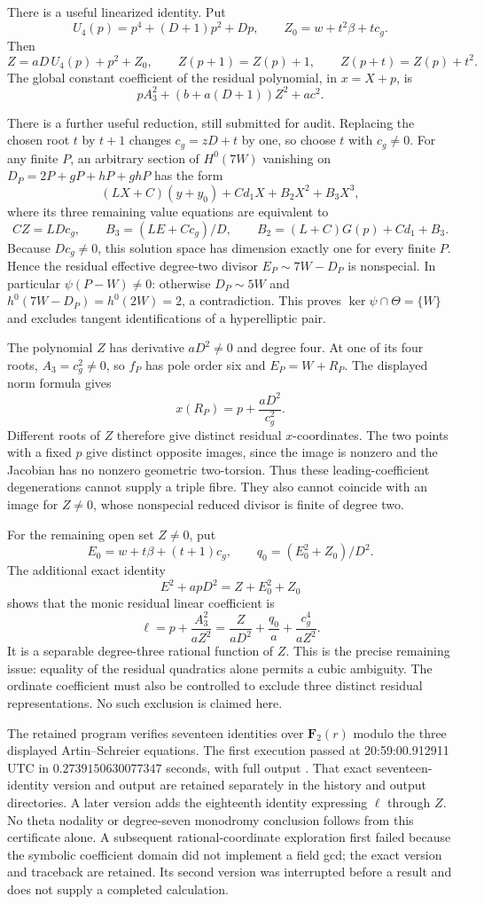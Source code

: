There is a useful linearized identity. Put
\[
 U_4(p)=p^4+(D+1)p^2+Dp,\qquad
 Z_0=w+t^2\beta+tc_g.
\]
Then
\[
 Z=aD\,U_4(p)+p^2+Z_0,\qquad
 Z(p+1)=Z(p)+1,\qquad Z(p+t)=Z(p)+t^2.
\]
The global constant coefficient of the residual polynomial, in
$x=X+p$, is
\[
 pA_3^2+(b+a(D+1))Z^2+ac^2.
\]

There is a further useful reduction, still submitted for audit.
Replacing the chosen root $t$ by $t+1$ changes $c_g=zD+t$ by one,
so choose $t$ with $c_g\ne0$. For any finite $P$, an arbitrary
section of $H^0(7W)$ vanishing on
$D_P=2P+gP+hP+ghP$ has the form
\[
 (LX+C)(y+y_0)+Cd_1X+B_2X^2+B_3X^3,
\]
where its three remaining value equations are equivalent to
\[
 CZ=LDc_g,\qquad
 B_3=(LE+Cc_g)/D,\qquad
 B_2=(L+C)G(p)+Cd_1+B_3.
\]
Because $Dc_g\ne0$, this solution space has dimension exactly
one for every finite $P$. Hence the residual effective degree-two
divisor $E_P\sim7W-D_P$ is nonspecial. In particular
$\psi(P-W)\ne0$: otherwise $D_P\sim5W$ and
$h^0(7W-D_P)=h^0(2W)=2$, a contradiction.
This proves $\ker\psi\cap\Theta=\{W\}$ and excludes tangent
identifications of a hyperelliptic pair.

The polynomial $Z$ has derivative $aD^2\ne0$ and degree four.
At one of its four roots, $A_3=c_g^2\ne0$, so $f_P$ has pole
order six and $E_P=W+R_P$. The displayed norm formula gives
\[
                  x(R_P)=p+\frac{aD^2}{c_g^2}.
\]
Different roots of $Z$ therefore give distinct residual
$x$-coordinates. The two points with a fixed $p$ give distinct
opposite images, since the image is nonzero and the Jacobian has
no nonzero geometric two-torsion. Thus these leading-coefficient
degenerations cannot supply a triple fibre. They also cannot
coincide with an image for $Z\ne0$, whose nonspecial reduced
divisor is finite of degree two.

For the remaining open set $Z\ne0$, put
\[
 E_0=w+t\beta+(t+1)c_g,
 \qquad q_0=(E_0^2+Z_0)/D^2.
\]
The additional exact identity
\[
 E^2+apD^2=Z+E_0^2+Z_0
\]
shows that the monic residual linear coefficient is
\[
 \ell=p+\frac{A_3^2}{aZ^2}
      =\frac{Z}{aD^2}+\frac{q_0}{a}
         +\frac{c_g^4}{aZ^2}.
\]
It is a separable degree-three rational function of $Z$.
This is the precise remaining issue: equality of the residual
quadratics alone permits a cubic ambiguity. The ordinate
coefficient must also be controlled to exclude three distinct
residual representations. No such exclusion is claimed here.

The retained program
 verifies seventeen
identities over $\mathbf F_2(r)$ modulo the three displayed
Artin--Schreier equations. The first execution passed at
20:59:00.912911 UTC in $0.2739150630077347$ seconds, with full output
.
That exact seventeen-identity version and output are retained
separately in the history and output directories. A later version
adds the eighteenth identity expressing $\ell$ through $Z$.
No theta nodality or degree-seven monodromy conclusion follows
from this certificate alone. A subsequent rational-coordinate
exploration first failed because the symbolic coefficient domain
did not implement a field gcd; the exact version and traceback are
retained. Its second version was interrupted before a result and
does not supply a completed calculation.

